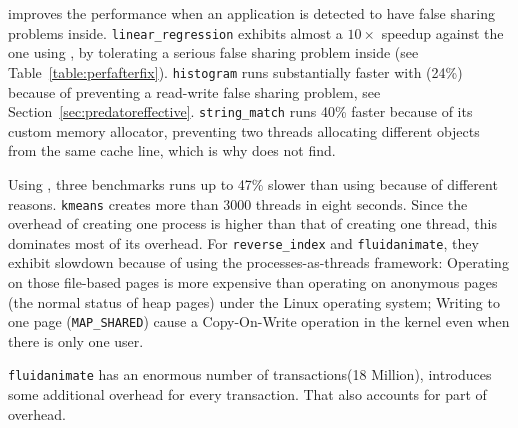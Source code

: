 \SheriffProtect{} improves the performance when an application is detected to have false sharing problems inside.  \texttt{linear\_regression} exhibits almost a $10\times$ speedup against the one using \pthreads{}, by tolerating a serious false sharing problem inside (see Table~\ref{table:perfafterfix}). \texttt{histogram} runs substantially faster with \SheriffProtect{} (24\%) because of preventing a read-write false sharing problem, see Section~\ref{sec:predatoreffective}. \texttt{string\_match} runs 40\% faster because of its custom memory allocator, preventing two threads allocating different objects from the same cache line, which is why \SheriffDetect{} does not find. 

Using \SheriffProtect{}, three benchmarks runs up to 47\% slower than using \pthreads{} because of different reasons. 
\texttt{kmeans} creates more than 3000 threads in eight seconds. Since the overhead of creating one process is higher than that of creating one thread, this dominates most of its overhead. For \texttt{reverse\_index} and \texttt{fluidanimate}, they exhibit slowdown because of using the processes-as-threads framework: Operating on those file-based pages is more expensive than operating on anonymous pages (the normal status of heap pages) under the Linux operating system; Writing to one page (\texttt{MAP\_SHARED}) cause a Copy-On-Write operation in the kernel even when there is only one user.  

\texttt{fluidanimate} has an enormous number of transactions(18 Million), \sheriffprotect{} 
introduces some additional overhead for every transaction. That also accounts for part of overhead.
